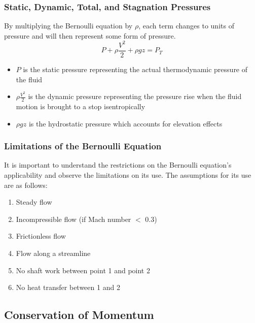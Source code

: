\documentclass[11pt]{article}
\begin{document}
\subsubsection{Static, Dynamic, Total, and Stagnation Pressures}
By multiplying the Bernoulli equation by $\rho$, each term changes to units of pressure and will then represent some form of pressure.
$$P + \rho\frac{V^2}{2} + \rho g z =P_T$$
\begin{itemize}
\item $P$ is the static pressure representing the actual thermodynamic pressure of the fluid 
\item $\rho \frac{V^2}{2}$ is the dynamic pressure representing the pressure rise when the fluid motion is brought to a stop isentropically
\item $\rho g z $ is the hydrostatic pressure which accounts for elevation effects
\end{itemize}

\subsubsection{Limitations of the Bernoulli Equation}
It is important to understand the restrictions on the Bernoulli equation's applicability and observe the limitations on its use. The assumptions for its use are as follows:
\begin{enumerate}
\item Steady flow
\item Incompressible flow (if Mach number $<$ 0.3)
\item Frictionless flow
\item Flow along a streamline
\item No shaft work between point 1 and point 2
\item No heat transfer between 1 and 2
\end{enumerate}

\subsection{Conservation of Momentum}
\end{document}
